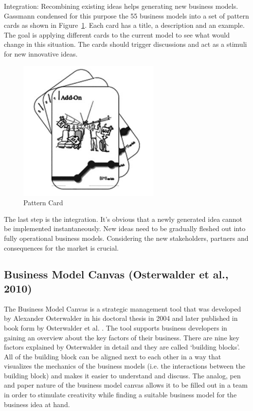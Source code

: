 		Integration: Recombining existing ideas helps generating new business models. Gassmann condensed for this purpose the 55 business models into a set of pattern cards as shown in Figure~\ref{fig:pattern_card}. Each card has a title, a description and an example. The goal is applying different cards to the current model to see what would change in this situation. The cards should trigger discussions and act as a stimuli for new innovative ideas.

		\begin{figure}[ht]
			    \begin{center}
			    \includegraphics[scale=0.6]{Talk11/Figure2.png}
			    \end{center}
			    \caption{Pattern Card}
			    \label{fig:pattern_card}
			\end{figure}

		The last step is the integration. It's obvious that a newly generated idea cannot be implemented instantaneously. New ideas need to be gradually fleshed out into fully operational business models. Considering the new stakeholders, partners and consequences for the market is crucial.

	\subsection{Business Model Canvas (Osterwalder et al., 2010)} 
	\label{sec:bmc}
		The Business Model Canvas is a strategic management tool that was developed by Alexander Osterwalder in his doctoral thesis in 2004 and later published in book form by Osterwalder et al. \cite{osterwalder}. The tool supports business developers in gaining an overview about the key factors of their business. There are nine key factors explained by Osterwalder in detail and they are called `building blocks'. All of the building block can be aligned next to each other in a way that visualizes the mechanics of the business models (i.e. the interactions between the building block) and makes it easier to understand and discuss. The analog, pen and paper nature of the business model canvas allows it to be filled out in a team in order to stimulate creativity while finding a suitable business model for the business idea at hand.

